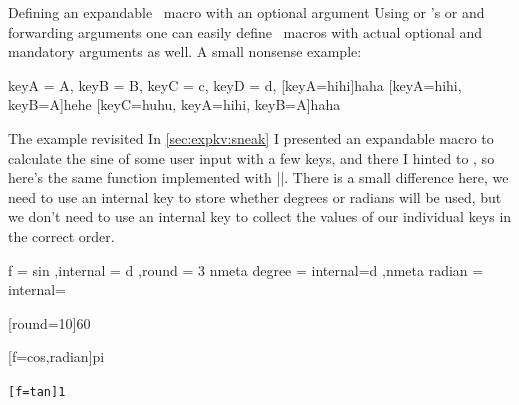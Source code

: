 \begin{example}{Defining an expandable \kv\ macro with an optional argument}
  Using  or \expkv's 
  or  and forwarding arguments one can easily define \kv\ macros
  with actual optional and mandatory arguments as well. A small nonsense
  example:
  \begin{enverb}[below,inter=resulting in]
    \makeatletter
    \newcommand*\nonsense{\ekvoptarg\nonsense@a{}}
    \ekvcHashAndForward\nonsense@a\nonsense@b
      {
        keyA = A,
        keyB = B,
        keyC = c,
        keyD = d,
      }
    \newcommand*\nonsense@b[2]
      {%
        \begin{tabular}{lll|}
          key & A & \ekvcValue{keyA}{#1} \\
              & B & \ekvcValue{keyB}{#1} \\
              & C & \ekvcValue{keyC}{#1} \\
              & D & \ekvcValue{keyD}{#1} \\
          \multicolumn{2}{l}{mandatory} & #2 \\
        \end{tabular}%
      }
    \makeatother
    \nonsense{} %
    \nonsense[keyA=hihi]{haha}
    \nonsense[keyA=hihi, keyB=A]{hehe}
    \nonsense[keyC=huhu, keyA=hihi, keyB=A]{haha}
  \end{enverb}
\end{example}

\begin{example}{The  example revisited}
  In \autoref{sec:expkv:sneak} I presented an expandable macro to calculate the
  sine of some user input with a few keys, and there I hinted to \expkvc, so
  here's the same function implemented with |\ekvcSplitAndForward|. There is a
  small difference here, we need to use an internal key to store whether degrees
  or radians will be used, but we don't need to use an internal key to collect
  the values of our individual keys in the correct order.
  \begin{enverb}
    \makeatletter
    \newcommand\sine{\ekvoptarg\sine@kv{}}
    \ekvcSplitAndForward\sine@kv\sine@do
      {
         f        = sin
        ,internal = d
        ,round    = 3
      }
    \ekvcSecondaryKeys\sine@kv
      {
         nmeta degree = internal=d
        ,nmeta radian = internal={}
      }
    \newcommand*\sine@do[4]{\fpeval{round(#1#2(#4),#3)}}
    \makeatother
    \sine{60}\par
    \sine[round=10]{60}\par
    \sine[f=cos,radian]{pi}\par
    \edef\myval{\sine[f=tan]{1}}\texttt{\meaning\myval}
  \end{enverb}
\end{example}


